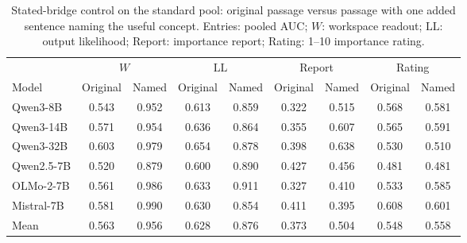 \begin{table}[t]
\centering
\caption{Stated-bridge control on the standard pool: original passage versus passage with one added sentence naming the useful concept. Entries: pooled AUC; $W$:
workspace readout; $\mathrm{LL}$: output likelihood; Report: importance report; Rating: 1--10
importance rating.}
\label{tab:statedcontrol}
\small
\setlength{\tabcolsep}{4pt}
\begin{tabular}{lcccccccc}
\toprule
& \multicolumn{2}{c}{$W$} & \multicolumn{2}{c}{$\mathrm{LL}$} & \multicolumn{2}{c}{Report} & \multicolumn{2}{c}{Rating} \\
\cmidrule(lr){2-3}\cmidrule(lr){4-5}\cmidrule(lr){6-7}\cmidrule(lr){8-9}
Model & Original & Named & Original & Named & Original & Named & Original & Named \\
\midrule
Qwen3-8B & 0.543 & 0.952 & 0.613 & 0.859 & 0.322 & 0.515 & 0.568 & 0.581 \\
Qwen3-14B & 0.571 & 0.954 & 0.636 & 0.864 & 0.355 & 0.607 & 0.565 & 0.591 \\
Qwen3-32B & 0.603 & 0.979 & 0.654 & 0.878 & 0.398 & 0.638 & 0.530 & 0.510 \\
Qwen2.5-7B & 0.520 & 0.879 & 0.600 & 0.890 & 0.427 & 0.456 & 0.481 & 0.481 \\
OLMo-2-7B & 0.561 & 0.986 & 0.633 & 0.911 & 0.327 & 0.410 & 0.533 & 0.585 \\
Mistral-7B & 0.581 & 0.990 & 0.630 & 0.854 & 0.411 & 0.395 & 0.608 & 0.601 \\
\midrule
Mean & 0.563 & 0.956 & 0.628 & 0.876 & 0.373 & 0.504 & 0.548 & 0.558 \\
\bottomrule
\end{tabular}
\end{table}
